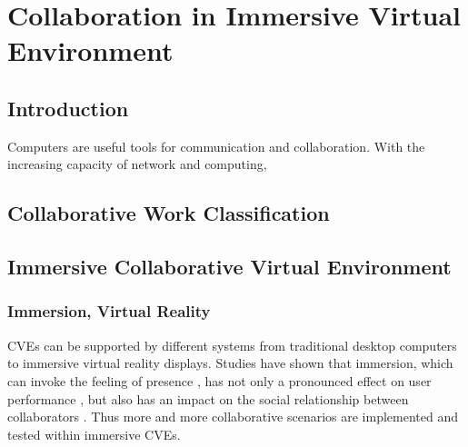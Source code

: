\chapter{Collaboration in Immersive Virtual Environment}
\label{chapter:context}
\minitoc

\section{Introduction}
Computers are useful tools for communication and collaboration. With the increasing capacity of network and computing, 

\section{Collaborative Work Classification}

\section{Immersive Collaborative Virtual Environment}

\subsection{Immersion, Virtual Reality}
CVEs can be supported by different systems from traditional desktop computers to immersive virtual reality displays. Studies have shown that immersion, which can invoke the feeling of presence \citep{Slater1994DepthPre}, has not only a pronounced effect on user performance \citep{Dangelo2008Benefits}, but also has an impact on the social relationship between collaborators \citep{Slater2000Small}. Thus more and more collaborative scenarios are implemented and tested within immersive CVEs.

